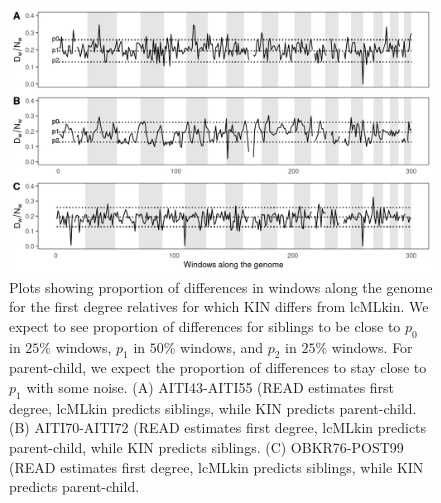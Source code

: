 \documentclass[12pt, letterpaper]{article}
\begin{document}
\begin{figure}[h]
    \centering
    \includegraphics[width=18cm]{supplementary_info/plots/egplot2.png}
    \caption{Plots showing proportion of differences in windows along the genome for the first degree relatives for which KIN differs from lcMLkin. We expect to see proportion of differences for siblings to be close to $p_0$ in $25\%$ windows, $p_1$ in $50\%$ windows, and $p_2$ in $25\%$ windows. For parent-child, we expect the proportion of differences to stay close to $p_1$ with some noise. (A) AITI43-AITI55 (READ estimates first degree, lcMLkin predicts siblings, while KIN predicts parent-child. (B) AITI70-AITI72 (READ estimates first degree, lcMLkin predicts parent-child, while KIN predicts siblings. (C) OBKR76-POST99 (READ estimates first degree, lcMLkin predicts siblings, while KIN predicts parent-child.}
    \label{figS9:eg2}
\end{figure}
\end{document}
